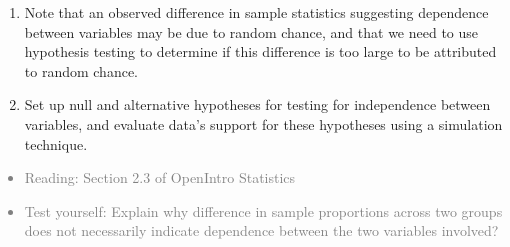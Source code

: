 \documentclass[11pt]{article}
\newcommand{\gray}[1]{\textcolor{gray}{#1}}
\begin{document}
%

\vspace{0.5cm}

%

\begin{enumerate}[resume]
\renewcommand\labelenumi{\textcolor{light}{\textbf{LO \theenumi.}}}
\item Note that an observed difference in sample statistics suggesting dependence between variables may be due to random chance, and that we need to use hypothesis testing to determine if this difference is too large to be attributed to random chance.
\item Set up null and alternative hypotheses for testing for independence between variables, and evaluate data's support for these hypotheses using a simulation technique.
\end{enumerate}

\gray{
{\it
\vspace{-0.75cm}
\begin{itemize}
\renewcommand{\labelitemi}{{\textcolor{dark}{$\ast$}}}
\item Reading: Section 2.3 of OpenIntro Statistics
\item Test yourself: Explain why difference in sample proportions across two groups does not necessarily indicate dependence between the two variables involved?
\end{itemize}
}}
\end{document}
